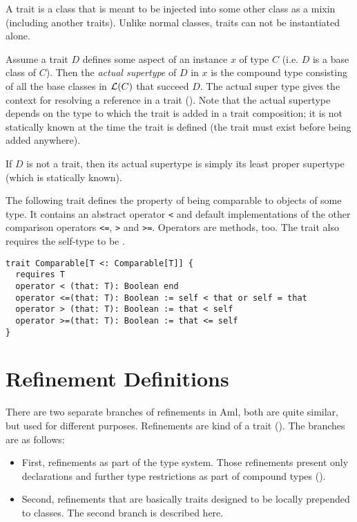 A trait is a class that is meant to be injected into some other class as a mixin (including another traits). Unlike normal classes, traits can not be instantiated alone. 

Assume a trait $D$ defines some aspect of an instance $x$ of type $C$ (i.e. $D$ is a base class of $C$). Then the {\em actual supertype} of $D$ in $x$ is the compound type consisting of all the base classes in ${\cal L}(C)$ that succeed $D$. The actual super type gives the context for resolving a  reference in a trait (). Note that the actual supertype depends on the type to which the trait is added in a trait composition; it is not statically known at the time the trait is defined (the trait must exist before being added anywhere). 

If $D$ is not a trait, then its actual supertype is simply its least proper supertype (which is statically known). 

\example The following trait defines the property of being comparable to objects of some type. It contains an abstract operator \lstinline!<! and default implementations of the other comparison operators \lstinline!<=!, \lstinline!>! and \lstinline!>=!. Operators are methods, too. The trait also requires the self-type to be . 
\begin{lstlisting}
trait Comparable[T <: Comparable[T]] {
  requires T
  operator < (that: T): Boolean end
  operator <=(that: T): Boolean := self < that or self = that
  operator > (that: T): Boolean := that < self
  operator >=(that: T): Boolean := that <= self
}
\end{lstlisting}






\section{Refinement Definitions}
\label{sec:refinements}

There are two separate branches of refinements in Aml, both are quite similar, but used for different purposes. Refinements are kind of a trait (). The branches are as follows:
\begin{itemize}
  \item[] First, refinements as part of the type system. Those refinements present only declarations and further type restrictions as part of compound types ().

  \item[] Second, refinements that are basically traits designed to be locally prepended to classes. The second branch is described here. 
\end{itemize}

